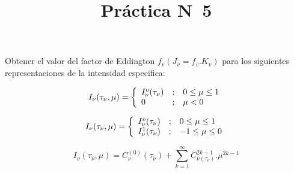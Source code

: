 \documentclass[12pt,spanish,a4paper]{practice}
\begin{document}
    \title{Práctica N\textdegree\ 5}
    \maketitle
    \begin{problem}\label{prob:1}
    Obtener el valor del factor de Eddington $f_{v} (J_{v}=f_{v}.K_{v})$ para los siguientes representaciones de la intensidad especifica:

        \begin{ppart}\label{prob:1:a}
            \begin{equation*}
                I_{\nu}(\tau_{\nu},\mu) = \left\{
                \begin{array}{l c l}
                    I_{\nu}^{o}(\tau_{\nu}) & ; & 0 \leq \mu \leq 1 \\
                    0 & ; &  \mu < 0
                \end{array}
                \right.
            \end{equation*}

        \end{ppart}

        \begin{ppart}\label{prob:1:b}
            \begin{equation*}
                I_{\nu}(\tau_{\nu},\mu) = \left\{
                \begin{array}{l c l}
                    I_{\nu}^{o}(\tau_{\nu}) & ; & 0 \leq \mu \leq 1 \\
                    I_{\nu}^{1}(\tau_{\nu}) & ; & -1 \leq \mu \leq 0
                \end{array}
                \right.
            \end{equation*}

        \end{ppart}

        \begin{ppart}\label{prob:1:c}
            \begin{equation*}
                I_{\nu}(\tau_{\nu},\mu) = C_{\nu}^{(0)}(\tau_{\nu}) + \sum_{k=1}^{\infty} C_{\nu (\tau_{\nu})}^{2k-1} . \mu^{2k-1}
            \end{equation*}
        \end{ppart}


\end{problem}
\end{document}
